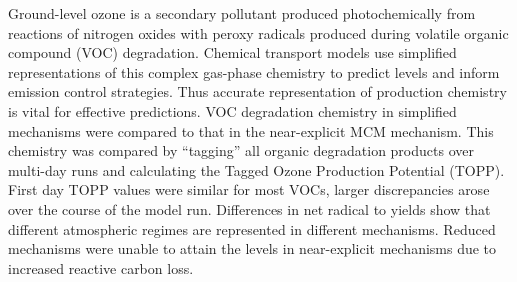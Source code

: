 Ground-level ozone is a secondary pollutant produced photochemically from reactions of nitrogen oxides with peroxy radicals produced during volatile organic compound (VOC) degradation. 
Chemical transport models use simplified representations of this complex gas-phase chemistry to predict  levels and inform emission control strategies. 
Thus accurate representation of  production chemistry is vital for effective predictions.
VOC degradation chemistry in simplified mechanisms were compared to that in the near-explicit MCM mechanism. 
This chemistry was compared by ``tagging'' all organic degradation products over multi-day runs and calculating the Tagged Ozone Production Potential (TOPP). 
First day TOPP values were similar for most VOCs, larger discrepancies arose over the course of the model run. 
Differences in net radical to  yields show that different atmospheric regimes are represented in different mechanisms.
Reduced mechanisms were unable to attain the  levels in near-explicit mechanisms due to increased reactive carbon loss.

